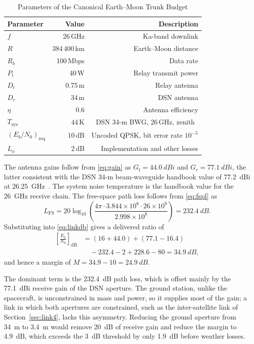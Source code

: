 \documentclass{IEEEoj}
\begin{document}
\begin{table}[!t]
\caption{Parameters of the Canonical Earth--Moon Trunk Budget}
\label{tab:budget}
\centering
\footnotesize
\begin{tabularx}{\columnwidth}{@{}>{\bfseries}lrR}
\toprule
{}\textbf{Parameter} & \textbf{Value} & \textbf{Description} \\
\midrule
$f$ & 26\,GHz & Ka-band downlink \\
$R$ & 384\,400\,km & Earth--Moon distance \\
$R_b$ & 100\,Mbps & Data rate \\
$P_t$ & 40\,W & Relay transmit power \\
$D_t$ & 0.75\,m & Relay antenna \\
$D_r$ & 34\,m & DSN antenna \\
$\eta$ & 0.6 & Antenna efficiency \\
$T_{\mathrm{sys}}$ & 44\,K & DSN 34-m BWG, 26\,GHz, zenith~\cite{dsn_34m_bwg} \\
$(E_b/N_0)_{\mathrm{req}}$ & 10\,dB & Uncoded QPSK, bit error rate $10^{-5}$ \\
$L_{\mathrm{o}}$ & 2\,dB & Implementation and other losses \\
\bottomrule
\end{tabularx}
\end{table}

The antenna gains follow from \eqref{eq:gain} as $G_t = \SI{44.0}{dBi}$ and $G_r = \SI{77.1}{dBi}$, the latter consistent with the DSN 34-m beam-waveguide handbook value of \SI{77.2}{dBi} at \SI{26.25}{GHz}~\cite{dsn_34m_bwg}. The system noise temperature is the handbook value for the \SI{26}{GHz} receive chain. The free-space path loss follows from \eqref{eq:fspl} as
\begin{equation}
L_{\mathrm{FS}} = 20\log_{10}\!\left(\frac{4\pi \cdot 3.844\times10^{8} \cdot 26\times10^{9}}{2.998\times10^{8}}\right) = \SI{232.4}{dB}.
\end{equation}
Substituting into \eqref{eq:linkdb} gives a delivered ratio of
\begin{align}
\left[\frac{E_b}{N_0}\right]_{\mathrm{dB}} &= (16 + 44.0) + (77.1 - 16.4) \nonumber \\
&\quad - 232.4 - 2 + 228.6 - 80 = \SI{34.9}{dB},
\end{align}
and hence a margin of $M = 34.9 - 10 = \SI{24.9}{dB}$.

The dominant term is the \SI{232.4}{dB} path loss, which is offset mainly by the \SI{77.1}{dBi} receive gain of the DSN aperture. The ground station, unlike the spacecraft, is unconstrained in mass and power, so it supplies most of the gain; a link in which both apertures are constrained, such as the inter-satellite link of Section~\ref{sec:link4}, lacks this asymmetry. Reducing the ground aperture from \SI{34}{m} to \SI{3.4}{m} would remove \SI{20}{dB} of receive gain and reduce the margin to \SI{4.9}{dB}, which exceeds the \SI{3}{dB} threshold by only \SI{1.9}{dB} before weather losses.
\end{document}
